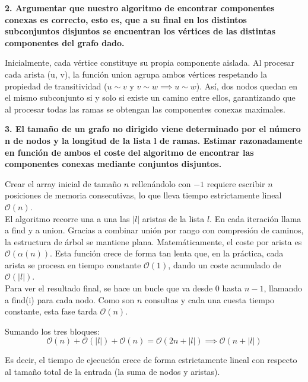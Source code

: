 \documentclass{article}
\begin{document}
\vspace{0.5cm}

\item \textbf {2. Argumentar que nuestro algoritmo de encontrar componentes conexas es correcto, esto es, que a su final en los distintos subconjuntos disjuntos se encuentran los vértices de las distintas componentes del grafo dado.}

\vspace{0.3cm}

\begin{enumerate}

     Inicialmente, cada vértice constituye su propia componente aislada. Al procesar cada arista (u, v), la función union agrupa ambos vértices respetando la propiedad de transitividad ($u \sim v$ y $v \sim w \implies u \sim w$). Así, dos nodos quedan en el mismo subconjunto si y solo si existe un camino entre ellos, garantizando que al procesar todas las ramas se obtengan las componentes conexas maximales.
    
\end{enumerate}

\vspace{0.5cm}

\item \textbf{3. El tamaño de un grafo no dirigido viene determinado por el número n de nodos y la longitud de la lista l de ramas. Estimar razonadamente en función de ambos el coste del algoritmo de encontrar las componentes conexas mediante conjuntos disjuntos.}

\vspace{0.3cm}

\begin{enumerate}

     Crear el array inicial de tamaño $n$ rellenándolo con $-1$ requiere escribir $n$ posiciones de memoria consecutivas, lo que lleva tiempo estrictamente lineal $\mathcal{O}(n)$. \\
     El algoritmo recorre una a una las $\vert{}l\vert{}$ aristas de la lista $l$. En cada iteración llama a find y a union. Gracias a combinar unión por rango con compresión de caminos, la estructura de árbol se mantiene plana. Matemáticamente, el coste por arista es $\mathcal{O}(\alpha(n))$. Esta función crece de forma tan lenta que, en la práctica, cada arista se procesa en tiempo constante $\mathcal{O}(1)$, dando un coste acumulado de $\mathcal{O}(\vert{}l\vert{})$.\\
     Para ver el resultado final, se hace un bucle que va desde $0$ hasta $n-1$, llamando a find(i) para cada nodo. Como son $n$ consultas y cada una cuesta tiempo constante, esta fase tarda $\mathcal{O}(n)$.

     \end{enumerate}
     
     \vspace{0.5cm}
     

     \noindent Sumando los tres bloques:
    $$\mathcal{O}(n) + \mathcal{O}(|l|) + \mathcal{O}(n) = \mathcal{O}(2n + |l|) \implies \mathcal{O}(n + |l|)$$

    \noindent Es decir, el tiempo de ejecución crece de forma estrictamente lineal con respecto al tamaño total de la entrada (la suma de nodos y aristas).

    
\end{document}
